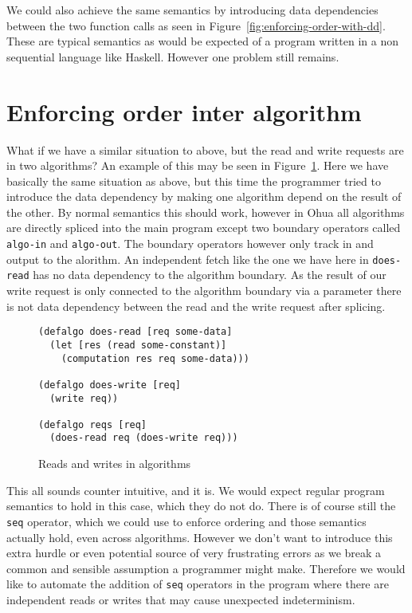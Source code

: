 We could also achieve the same semantics by introducing data dependencies between the two function calls as seen in Figure~\ref{fig:enforcing-order-with-dd}.
These are typical semantics as would be expected of a program written in a non sequential language like Haskell.
However one problem still remains.

\section{Enforcing order inter algorithm}

What if we have a similar situation to above, but the read and write requests are in two algorithms?
An example of this may be seen in Figure~\ref{fig:reads-and-writes-in-algos}.
Here we have basically the same situation as above, but this time the programmer tried to introduce the data dependency by making one algorithm depend on the result of the other.
By normal semantics this should work, however in Ohua all algorithms are directly spliced into the main program except two boundary operators called \texttt{algo-in} and \texttt{algo-out}.
The boundary operators however only track in and output to the alorithm.
An independent fetch like the one we have here in \texttt{does-read} has no data dependency to the algorithm boundary.
As the result of our write request is only connected to the algorithm boundary via a parameter there is not data dependency between the read and the write request after splicing.

\begin{figure}
\begin{verbatim}
(defalgo does-read [req some-data]
  (let [res (read some-constant)]
    (computation res req some-data)))

(defalgo does-write [req]
  (write req))

(defalgo reqs [req]
  (does-read req (does-write req)))
\end{verbatim}
\caption{Reads and writes in algorithms}
\label{fig:reads-and-writes-in-algos}
\end{figure}

This all sounds counter intuitive, and it is.
We would expect regular program semantics to hold in this case, which they do not do.
There is of course still the \texttt{seq} operator, which we could use to enforce ordering and those semantics actually hold, even across algorithms.
However we don't want to introduce this extra hurdle or even potential source of very frustrating errors as we break a common and sensible assumption a programmer might make.
Therefore we would like to automate the addition of \texttt{seq} operators in the program where there are independent reads or writes that may cause unexpected indeterminism.

